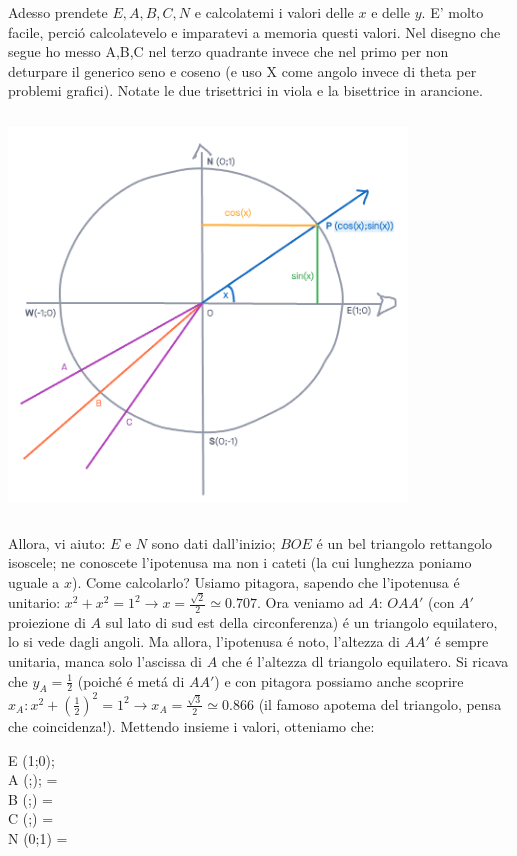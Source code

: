 Adesso prendete $E,A,B,C,N$ e calcolatemi i valori delle $x$ e delle $y$. E' molto facile, perci\'o calcolatevelo e imparatevi a memoria questi valori.
Nel disegno che segue ho messo A,B,C nel terzo quadrante invece che nel primo per non deturpare il generico seno e coseno (e uso X come angolo invece di
theta per problemi grafici). Notate le due trisettrici in viola e la bisettrice in arancione.

\includegraphics[height = 300pt, width = 300pt]{images/04trigonometria/circonferenza goniometrica con A B C.png}


Allora, vi aiuto: $E$ e $N$ sono dati dall'inizio; $BOE$ \'e un bel triangolo rettangolo isoscele; ne conoscete l'ipotenusa ma non i cateti (la cui
lunghezza poniamo uguale a $x$). Come calcolarlo? Usiamo pitagora, sapendo che l'ipotenusa \'e unitario: 
$x^2+x^2=1^2 \longrightarrow x=\frac{\sqrt{2}}{2}\simeq 0.707$. Ora veniamo ad $A$: $OAA'$ (con $A'$ proiezione di $A$ sul lato di sud est
della circonferenza) \'e un triangolo equilatero, lo si vede dagli angoli. Ma allora, l'ipotenusa \'e noto, l'altezza di $AA'$ \'e sempre unitaria,
manca solo l'ascissa di $A$ che \'e l'altezza dl triangolo equilatero. Si ricava che $y_A=\frac{1}{2}$ (poich\'e \'e met\'a di $AA'$) e con pitagora
possiamo anche scoprire $x_A: x^2+(\frac{1}{2})^2=1^2 \longrightarrow x_A=\frac{\sqrt{3}}{2} \simeq 0.866$ (il famoso apotema del triangolo, pensa che
coincidenza!). Mettendo insieme i valori, otteniamo che:

\begin{equazione}
	E \equiv (1;0);  \\
	A \equiv (;); \theta= \\
	B \equiv (;) 			\theta= \\
	C \equiv (;) \theta= \\
	N \equiv (0;1) \theta= \\
\end{equazione}

